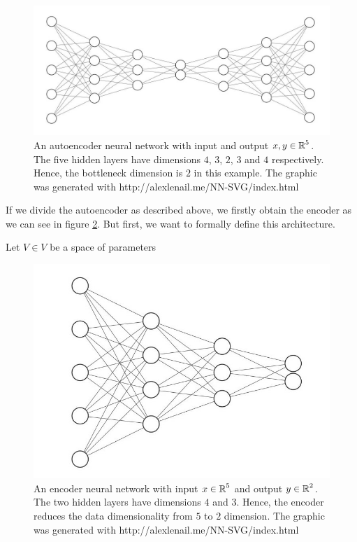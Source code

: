 \begin{figure}[H]
\begin{center}
   \begin{minipage}[b]{\linewidth}
      \includegraphics[width=\linewidth]{autoencoder}
      \caption{An autoencoder neural network with input and output $x, y\in \operatorname{\mathbb{R}}^5$. The five hidden layers have dimensions $4$, $3$, $2$, $3$ and $4$ respectively. Hence, the bottleneck dimension is $2$ in this example. The graphic was generated with http://alexlenail.me/NN-SVG/index.html}\label{autoencoder}
	\end{minipage}
\end{center}
\end{figure}


If we divide the autoencoder as described above, we firstly obtain the encoder as we can see in figure \ref{encoder}. But first, we want to formally define this architecture.

\begin{definition}
Let $V \in V$ be a space of parameters
\end{definition}


\begin{figure}[H]
\begin{center}
   \begin{minipage}[b]{\linewidth}
      \includegraphics[width=\linewidth]{encoder}
      \caption{An encoder neural network with input $x\in \operatorname{\mathbb{R}}^5$ and output $y \in \operatorname{\mathbb{R}}^2$. The two hidden layers have dimensions $4$ and $3$. Hence, the encoder reduces the data dimensionality from $5$ to $2$ dimension. The graphic was generated with http://alexlenail.me/NN-SVG/index.html}\label{encoder}
	\end{minipage}
\end{center}
\end{figure}


